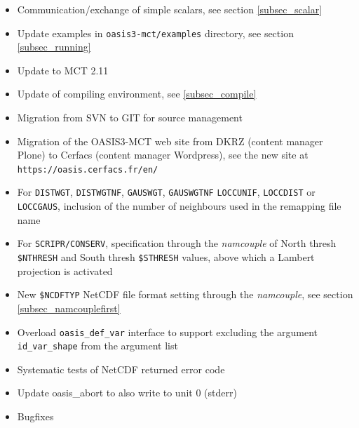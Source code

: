 \begin{itemize}
\item Communication/exchange of simple scalars, see section \ref{subsec_scalar}

\item Update examples in {\tt oasis3-mct/examples} directory, see
  section \ref{subsec_running}

\item Update to MCT 2.11

\item Update of compiling environment, see \ref{subsec_compile}

\item Migration from SVN to GIT for source management

\item Migration of the OASIS3-MCT web site from DKRZ (content
  manager Plone) to Cerfacs (content manager Wordpress), see the new
  site at {\tt https://oasis.cerfacs.fr/en/}

\item For {\tt DISTWGT}, {\tt DISTWGTNF}, {\tt GAUSWGT},
  {\tt GAUSWGTNF}  {\tt LOCCUNIF}, {\tt LOCCDIST} or {\tt LOCCGAUS},
  inclusion of the number of neighbours used in the remapping file
  name

\item  For {\tt SCRIPR/CONSERV}, specification through the {\it namcouple} of North thresh
  {\tt \$NTHRESH} and South thresh {\tt \$STHRESH} values, above
  which a Lambert projection is activated

\item New {\tt \$NCDFTYP} NetCDF file format setting through the
    {\it namcouple}, see section \ref{subsec_namcouplefirst}

\item Overload {\tt oasis\_def\_var} interface to support excluding the argument {\tt id\_var\_shape} from the argument list

\item Systematic tests of NetCDF returned error code

\item Update oasis\_abort to also write to unit 0 (stderr)

\item Bugfixes


\end{itemize}
